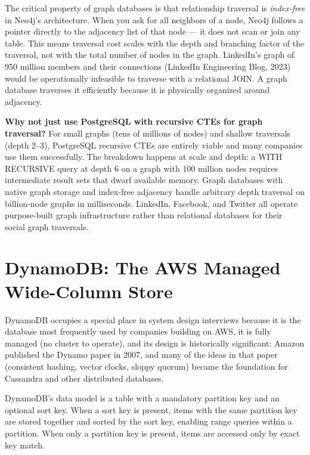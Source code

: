\documentclass[11pt,a4paper]{article}
\begin{document}
The critical property of graph databases is that relationship traversal is \textit{index-free} in Neo4j's architecture. When you ask for all neighbors of a node, Neo4j follows a pointer directly to the adjacency list of that node --- it does not scan or join any table. This means traversal cost scales with the depth and branching factor of the traversal, not with the total number of nodes in the graph. LinkedIn's graph of 950 million members and their connections (LinkedIn Engineering Blog, 2023) would be operationally infeasible to traverse with a relational JOIN. A graph database traverses it efficiently because it is physically organized around adjacency.

\begin{thinkbox}
\textbf{Why not just use PostgreSQL with recursive CTEs for graph traversal?} For small graphs (tens of millions of nodes) and shallow traversals (depth 2--3), PostgreSQL recursive CTEs are entirely viable and many companies use them successfully. The breakdown happens at scale and depth: a WITH RECURSIVE query at depth 6 on a graph with 100 million nodes requires intermediate result sets that dwarf available memory. Graph databases with native graph storage and index-free adjacency handle arbitrary depth traversal on billion-node graphs in milliseconds. LinkedIn, Facebook, and Twitter all operate purpose-built graph infrastructure rather than relational databases for their social graph traversals.
\end{thinkbox}

\section{DynamoDB: The AWS Managed Wide-Column Store}

DynamoDB occupies a special place in system design interviews because it is the database most frequently used by companies building on AWS, it is fully managed (no cluster to operate), and its design is historically significant: Amazon published the Dynamo paper in 2007, and many of the ideas in that paper (consistent hashing, vector clocks, sloppy quorum) became the foundation for Cassandra and other distributed databases.

DynamoDB's data model is a table with a mandatory partition key and an optional sort key. When a sort key is present, items with the same partition key are stored together and sorted by the sort key, enabling range queries within a partition. When only a partition key is present, items are accessed only by exact key match.
\end{document}
